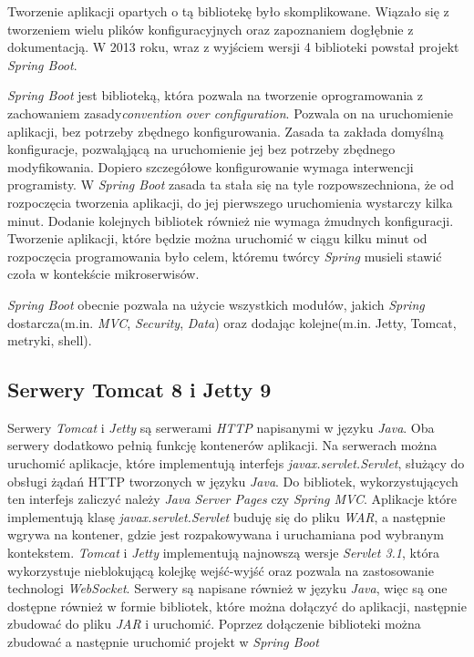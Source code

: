 Tworzenie aplikacji opartych o tą bibliotekę było skomplikowane. Wiązało się z tworzeniem wielu plików konfiguracyjnych oraz zapoznaniem dogłębnie z dokumentacją. W 2013 roku, wraz z wyjściem wersji 4 biblioteki powstał projekt \textsl{Spring Boot}. 

\textsl{Spring Boot} jest biblioteką, która pozwala na tworzenie oprogramowania z zachowaniem zasady\textsl{convention over configuration}. Pozwala on na uruchomienie aplikacji, bez potrzeby zbędnego konfigurowania. Zasada ta zakłada domyślną konfiguracje, pozwaląjącą na uruchomienie jej bez potrzeby zbędnego modyfikowania. Dopiero szczegółowe konfigurowanie wymaga interwencji programisty. W \textsl{Spring Boot} zasada ta stała się na tyle rozpowszechniona, że od rozpoczęcia tworzenia aplikacji, do jej pierwszego uruchomienia wystarczy kilka minut. Dodanie kolejnych bibliotek również nie wymaga żmudnych konfiguracji. Tworzenie aplikacji, które będzie można uruchomić w ciągu kilku minut od rozpoczęcia programowania było celem, któremu twórcy \textsl{Spring} musieli stawić czoła w kontekście mikroserwisów. 

\textsl{Spring Boot} obecnie pozwala na użycie wszystkich modułów, jakich \textsl{Spring} dostarcza(m.in. \textsl{MVC}, \textsl{Security}, \textsl{Data}) oraz dodając kolejne(m.in. Jetty, Tomcat, metryki, shell). 

\subsection{Serwery Tomcat 8 i Jetty 9} 
Serwery \textsl{Tomcat} i \textsl{Jetty} są serwerami \textsl{HTTP} napisanymi w języku \textsl{Java}. Oba serwery dodatkowo pełnią funkcję kontenerów aplikacji. Na serwerach można uruchomić aplikacje, które implementują interfejs \textsl{javax.servlet.Servlet}, służący do obsługi żądań HTTP tworzonych w języku \textsl{Java}. Do bibliotek, wykorzystujących ten interfejs zaliczyć należy \textsl{Java Server Pages} czy \textsl{Spring MVC}. Aplikacje które implementują klasę \textsl{javax.servlet.Servlet} buduję się do pliku \textsl{WAR}, a następnie wgrywa na kontener, gdzie jest rozpakowywana i uruchamiana pod wybranym kontekstem. \textsl{Tomcat} i \textsl{Jetty} implementują najnowszą wersje \textsl{Servlet 3.1}, która wykorzystuje nieblokującą kolejkę wejść-wyjść oraz pozwala na zastosowanie technologi \textsl{WebSocket}. Serwery są napisane również w języku \textsl{Java}, więc są one dostępne również w formie bibliotek, które można dołączyć do aplikacji, następnie zbudować do pliku \textsl{JAR} i uruchomić. Poprzez dołączenie biblioteki można zbudować a następnie uruchomić projekt w \textsl{Spring Boot}
